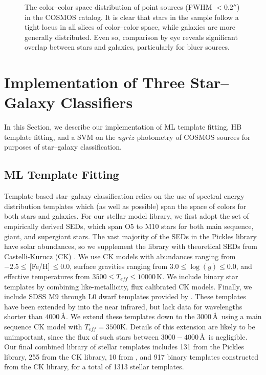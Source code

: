 \documentclass[12pt,preprint]{aastex}
\begin{document}
\begin{figure}
\centering
\caption{The color--color space distribution of point sources (FWHM $<
  0.2''$) in the COSMOS catalog.  It is clear that stars in the sample
  follow a tight locus in all slices of color--color space, while
  galaxies are more generally distributed.  Even so, comparison by eye
  reveals significant overlap between stars and galaxies, particularly
  for bluer sources.}
\label{fig:color-color-data}
\end{figure}


\section{Implementation of Three Star--Galaxy Classifiers}
\label{sec:specifics}

In this Section, we describe our implementation of ML template
fitting, HB template fitting, and a SVM on the $ugriz$ photometry of
COSMOS sources for purposes of star--galaxy classification.

\subsection{ML Template Fitting}
\label{ssec:MLspecifics}

Template based star--galaxy classification relies on the use of
spectral energy distribution templates which (as well as possible)
span the space of colors for both stars and galaxies.  For our stellar
model library, we first adopt the \citet{pickles98} set of empirically
derived SEDs, which span O5 to M10 stars for both main sequence,
giant, and supergiant stars.  The vast majority of the SEDs in the
Pickles library have solar abundances, so we supplement the library
with theoretical SEDs from Castelli-Kurucz (CK) \citep{castelli04a}.
We use CK models with abundances ranging from $-2.5
\le\,$[Fe/H]$\,\le0.0$, surface gravities ranging from
$3.0\le\log(g)\le0.0$, and effective temperatures from $3500 \le
T_{eff} \le 10000\,$K.  We include binary star templates by combining
like-metallicity, flux calibrated CK models.  Finally, we include SDSS
M9 through L0 dwarf templates provided by \citet{bochanski07}.  These
templates have been extended by \citeauthor{bochanski07} into the near
infrared, but lack data for wavelengths shorter than $4000\,$\AA.  We
extend these templates down to the $3000\,$\AA\, using a main sequence
CK model with $T_{eff}=3500$K.  Details of this extension are likely
to be unimportant, since the flux of such stars between
$3000-4000\,$\AA\, is negligible.  Our final combined library of stellar
templates includes 131 from the Pickles library, 255 from the CK library,
10 from \citet{bochanski07}, and 917 binary templates constructed from
the CK library, for a total of 1313 stellar templates.
\end{document}
